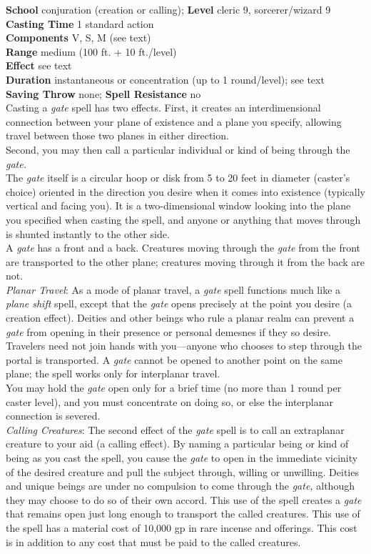 \textbf{School} conjuration (creation or calling); \textbf{Level} cleric 9, sorcerer/wizard 9\\
\textbf{Casting Time} 1 standard action\\
\textbf{Components} V, S, M (see text)\\
\textbf{Range }medium (100 ft. + 10 ft./level)\\
\textbf{Effect} see text\\
\textbf{Duration} instantaneous or concentration (up to 1 round/level); see text\\
\textbf{Saving Throw} none; \textbf{Spell Resistance} no\\
Casting a \textit{gate }spell has two effects. First, it creates an interdimensional connection between your plane of existence and a plane you specify, allowing travel between those two planes in either direction.\\
Second, you may then call a particular individual or kind of being through the \textit{gate.}\\
The \textit{gate }itself is a circular hoop or disk from 5 to 20 feet in diameter (caster's choice) oriented in the direction you desire when it comes into existence (typically vertical and facing you). It is a two-dimensional window looking into the plane you specified when casting the spell, and anyone or anything that moves through is shunted instantly to the other side.\\
A \textit{gate }has a front and a back. Creatures moving through the \textit{gate }from the front are transported to the other plane; creatures moving through it from the back are not.\\
\textit{Planar Travel}: As a mode of planar travel, a \textit{gate }spell functions much like a \textit{plane shift }spell, except that the \textit{gate }opens precisely at the point you desire (a creation effect). Deities and other beings who rule a planar realm can prevent a \textit{gate }from opening in their presence or personal demesnes if they so desire. Travelers need not join hands with you—anyone who chooses to step through the portal is transported. A \textit{gate }cannot be opened to another point on the same plane; the spell works only for interplanar travel.\\
You may hold the \textit{gate }open only for a brief time (no more than 1 round per caster level), and you must concentrate on doing so, or else the interplanar connection is severed.\\
\textit{Calling Creatures}: The second effect of the \textit{gate }spell is to call an extraplanar creature to your aid (a calling effect). By naming a particular being or kind of being as you cast the spell, you cause the \textit{gate }to open in the immediate vicinity of the desired creature and pull the subject through, willing or unwilling. Deities and unique beings are under no compulsion to come through the \textit{gate, }although they may choose to do so of their own accord. This use of the spell creates a \textit{gate }that remains open just long enough to transport the called creatures. This use of the spell has a material cost of 10,000 gp in rare incense and offerings. This cost is in addition to any cost that must be paid to the called creatures.\\
